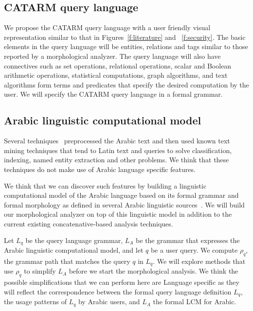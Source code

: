 \documentclass[12pt]{article}
\begin{document}
\subsection{CATARM query language}
\label{s:design:query}

We propose the CATARM query language with a user friendly
visual representation similar to that in Figures~\ref{f:literature} and
~\ref{f:security}. 
The basic elements in the query language will be entities, relations
and tags similar to those reported by a morphological analyzer. 
The query language will also have connectives such as set operations, 
relational operations, 
scalar and Boolean arithmetic operations, 
statistical computations, graph algorithms, and text algorithms
form terms and predicates that specify the desired computation
by the user. 
We will specify the CATARM query language in a formal grammar.

\subsection{Arabic linguistic computational model }
\label{s:design:lcm}

Several techniques~\cite{AEL07,Ham07,Abd07,MEl03} 
preprocessed the Arabic text and then used known text 
mining techniques that tend to Latin text and queries
to solve classification, indexing, named entity 
extraction and other problems.
We think that these techniques do not make use 
of Arabic language specific features.

We think that we can discover such features by building
a linguistic computational model of the Arabic language
based on its formal grammar and formal morphology
as defined in several Arabic linguistic 
sources~\cite{Sha73,Abd00,Abd001}.
We will build our morphological analyzer on top 
of this linguistic model in addition to the current existing
concatenative-based analysis techniques. 

Let $L_q$ be the query language grammar, 
$L_A$ be the grammar that expresses the Arabic linguistic
computational model, and let $q$ be a user query.
We compute $\rho_q$, the grammar path that matches 
the query $q$ in $L_q$. 
We will explore methods that use $\rho_q$ to simplify 
$L_A$ before we start the morphological analysis. 
We think the possible simplifications that we can perform
here are Language specific as they will reflect the 
correspondence between the formal query language definition $L_q$, 
the usage patterns of $L_q$  by Arabic users, 
and $L_A$ the formal LCM for Arabic. 
\end{document}
